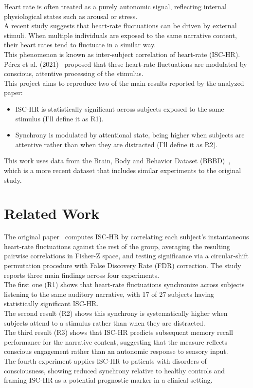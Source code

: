 \documentclass[pdflatex,sn-mathphys-num]{sn-jnl}%
\theoremstyle{thmstyleone}%
\theoremstyle{thmstyletwo}%
\theoremstyle{thmstylethree}%
\begin{document}
Heart rate is often treated as a purely autonomic signal, reflecting internal physiological states such as arousal or stress.\\
A recent study suggests that heart-rate fluctuations can be driven by external stimuli.
When multiple individuals are exposed to the same narrative content, their heart rates tend to fluctuate in a similar way.\\
This phenomenon is known as inter-subject correlation of heart-rate (ISC-HR).\\

Pérez et al. (2021)~\cite{perez2021} proposed that these heart-rate fluctuations are modulated by conscious, attentive processing of the stimulus. \\

This project aims to reproduce two of the main results reported by the analyzed paper:
\begin{itemize}
\item ISC-HR is statistically significant across subjects exposed to the same stimulus (I'll define it as R1).
\item Synchrony is modulated by attentional state, being higher when subjects are attentive rather than when they are distracted (I'll define it as R2).
\end{itemize}

This work uses data from the Brain, Body and Behavior Dataset (BBBD)~\cite{bbbd}, which is a more recent dataset that includes similar experiments to the original study.

\section{Related Work}\label{Sec2}

The original paper~\cite{perez2021} computes ISC-HR by correlating each subject's instantaneous heart-rate fluctuations against the rest of the group, averaging the resulting pairwise correlations in Fisher-Z space, and testing significance via a circular-shift permutation procedure with False Discovery Rate (FDR) correction.
The study reports three main findings across four experiments.\\
The first one (R1) shows that heart-rate fluctuations synchronize across subjects listening to the same auditory narrative, with 17 of 27 subjects having statistically significant ISC-HR.\\
The second result (R2) shows this synchrony is systematically higher when subjects attend to a stimulus rather than when they are distracted.\\
The third result (R3) shows that ISC-HR predicts subsequent memory recall performance for the narrative content, suggesting that the measure reflects conscious engagement rather than an autonomic response to sensory input.\\
The fourth experiment applies ISC-HR to patients with disorders of consciousness, showing reduced synchrony relative to healthy controls and framing ISC-HR as a potential prognostic marker in a clinical setting.
\end{document}
